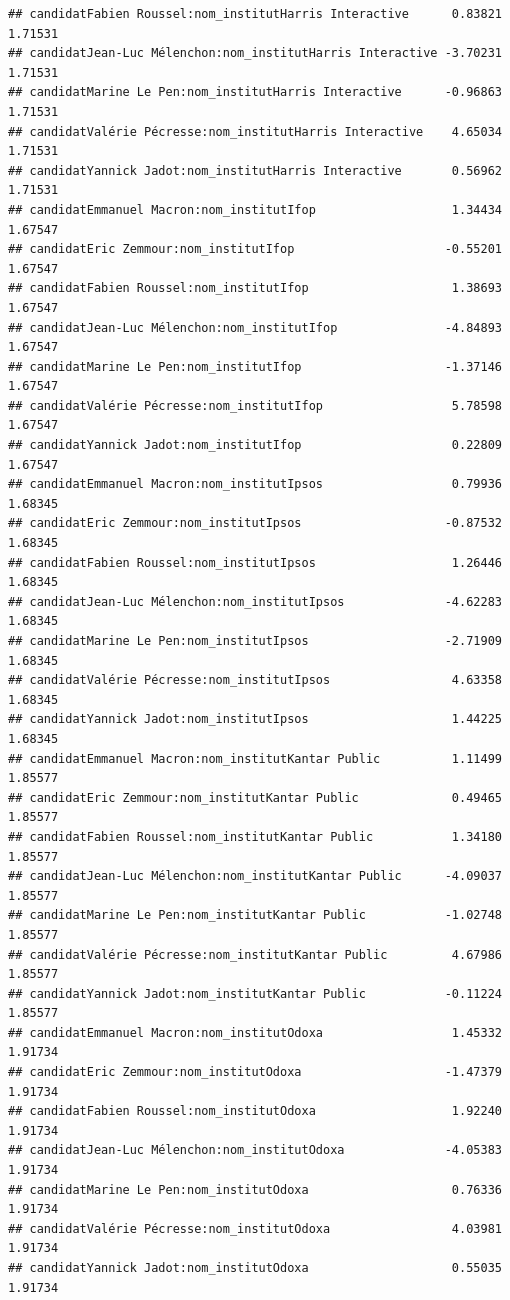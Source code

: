 \documentclass[
]{book}
\begin{document}
\begin{verbatim}
## candidatFabien Roussel:nom_institutHarris Interactive      0.83821    1.71531
## candidatJean-Luc Mélenchon:nom_institutHarris Interactive -3.70231    1.71531
## candidatMarine Le Pen:nom_institutHarris Interactive      -0.96863    1.71531
## candidatValérie Pécresse:nom_institutHarris Interactive    4.65034    1.71531
## candidatYannick Jadot:nom_institutHarris Interactive       0.56962    1.71531
## candidatEmmanuel Macron:nom_institutIfop                   1.34434    1.67547
## candidatEric Zemmour:nom_institutIfop                     -0.55201    1.67547
## candidatFabien Roussel:nom_institutIfop                    1.38693    1.67547
## candidatJean-Luc Mélenchon:nom_institutIfop               -4.84893    1.67547
## candidatMarine Le Pen:nom_institutIfop                    -1.37146    1.67547
## candidatValérie Pécresse:nom_institutIfop                  5.78598    1.67547
## candidatYannick Jadot:nom_institutIfop                     0.22809    1.67547
## candidatEmmanuel Macron:nom_institutIpsos                  0.79936    1.68345
## candidatEric Zemmour:nom_institutIpsos                    -0.87532    1.68345
## candidatFabien Roussel:nom_institutIpsos                   1.26446    1.68345
## candidatJean-Luc Mélenchon:nom_institutIpsos              -4.62283    1.68345
## candidatMarine Le Pen:nom_institutIpsos                   -2.71909    1.68345
## candidatValérie Pécresse:nom_institutIpsos                 4.63358    1.68345
## candidatYannick Jadot:nom_institutIpsos                    1.44225    1.68345
## candidatEmmanuel Macron:nom_institutKantar Public          1.11499    1.85577
## candidatEric Zemmour:nom_institutKantar Public             0.49465    1.85577
## candidatFabien Roussel:nom_institutKantar Public           1.34180    1.85577
## candidatJean-Luc Mélenchon:nom_institutKantar Public      -4.09037    1.85577
## candidatMarine Le Pen:nom_institutKantar Public           -1.02748    1.85577
## candidatValérie Pécresse:nom_institutKantar Public         4.67986    1.85577
## candidatYannick Jadot:nom_institutKantar Public           -0.11224    1.85577
## candidatEmmanuel Macron:nom_institutOdoxa                  1.45332    1.91734
## candidatEric Zemmour:nom_institutOdoxa                    -1.47379    1.91734
## candidatFabien Roussel:nom_institutOdoxa                   1.92240    1.91734
## candidatJean-Luc Mélenchon:nom_institutOdoxa              -4.05383    1.91734
## candidatMarine Le Pen:nom_institutOdoxa                    0.76336    1.91734
## candidatValérie Pécresse:nom_institutOdoxa                 4.03981    1.91734
## candidatYannick Jadot:nom_institutOdoxa                    0.55035    1.91734

\end{verbatim}
\end{document}
